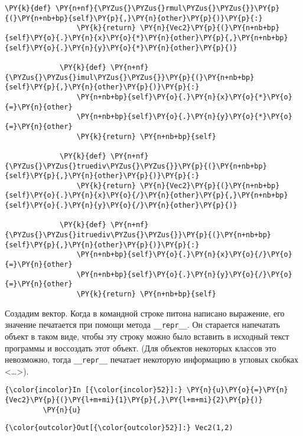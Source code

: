 \begin{Verbatim}[commandchars=\\\{\}]
             \PY{k}{def} \PY{n+nf}{\PYZus{}\PYZus{}rmul\PYZus{}\PYZus{}}\PY{p}{(}\PY{n+nb+bp}{self}\PY{p}{,}\PY{n}{other}\PY{p}{)}\PY{p}{:}
                 \PY{k}{return} \PY{n}{Vec2}\PY{p}{(}\PY{n+nb+bp}{self}\PY{o}{.}\PY{n}{x}\PY{o}{*}\PY{n}{other}\PY{p}{,}\PY{n+nb+bp}{self}\PY{o}{.}\PY{n}{y}\PY{o}{*}\PY{n}{other}\PY{p}{)}
             
             \PY{k}{def} \PY{n+nf}{\PYZus{}\PYZus{}imul\PYZus{}\PYZus{}}\PY{p}{(}\PY{n+nb+bp}{self}\PY{p}{,}\PY{n}{other}\PY{p}{)}\PY{p}{:}
                 \PY{n+nb+bp}{self}\PY{o}{.}\PY{n}{x}\PY{o}{*}\PY{o}{=}\PY{n}{other}
                 \PY{n+nb+bp}{self}\PY{o}{.}\PY{n}{y}\PY{o}{*}\PY{o}{=}\PY{n}{other}
                 \PY{k}{return} \PY{n+nb+bp}{self}
             
             \PY{k}{def} \PY{n+nf}{\PYZus{}\PYZus{}truediv\PYZus{}\PYZus{}}\PY{p}{(}\PY{n+nb+bp}{self}\PY{p}{,}\PY{n}{other}\PY{p}{)}\PY{p}{:}
                 \PY{k}{return} \PY{n}{Vec2}\PY{p}{(}\PY{n+nb+bp}{self}\PY{o}{.}\PY{n}{x}\PY{o}{/}\PY{n}{other}\PY{p}{,}\PY{n+nb+bp}{self}\PY{o}{.}\PY{n}{y}\PY{o}{/}\PY{n}{other}\PY{p}{)}
             
             \PY{k}{def} \PY{n+nf}{\PYZus{}\PYZus{}itruediv\PYZus{}\PYZus{}}\PY{p}{(}\PY{n+nb+bp}{self}\PY{p}{,}\PY{n}{other}\PY{p}{)}\PY{p}{:}
                 \PY{n+nb+bp}{self}\PY{o}{.}\PY{n}{x}\PY{o}{/}\PY{o}{=}\PY{n}{other}
                 \PY{n+nb+bp}{self}\PY{o}{.}\PY{n}{y}\PY{o}{/}\PY{o}{=}\PY{n}{other}
                 \PY{k}{return} \PY{n+nb+bp}{self}
\end{Verbatim}

    Создадим вектор. Когда в командной строке питона написано выражение, его
значение печатается при помощи метода \texttt{\_\_repr\_\_}. Он
старается напечатать объект в таком виде, чтобы эту строку можно было
вставить в исходный текст программы и воссоздать этот объект. (Для
объектов некоторых классов это невозможно, тогда \texttt{\_\_repr\_\_}
печатает некоторую информацию в угловых скобках
\textless{}\ldots{}\textgreater{}).

    \begin{Verbatim}[commandchars=\\\{\}]
{\color{incolor}In [{\color{incolor}52}]:} \PY{n}{u}\PY{o}{=}\PY{n}{Vec2}\PY{p}{(}\PY{l+m+mi}{1}\PY{p}{,}\PY{l+m+mi}{2}\PY{p}{)}
         \PY{n}{u}
\end{Verbatim}

            \begin{Verbatim}[commandchars=\\\{\}]
{\color{outcolor}Out[{\color{outcolor}52}]:} Vec2(1,2)
\end{Verbatim}
        
